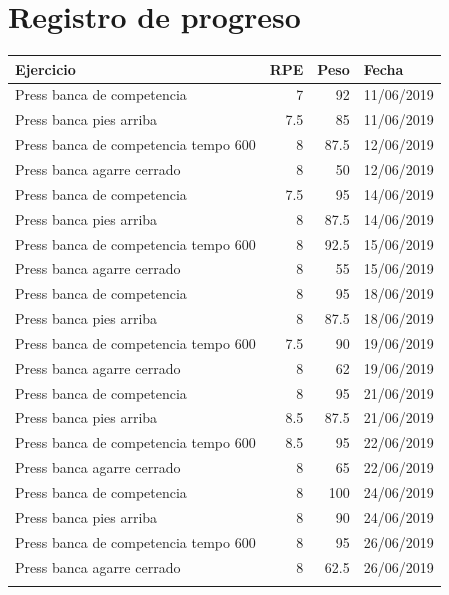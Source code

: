 \documentclass[11pt]{article}
\begin{document}
\section{Registro de progreso}
\label{sec:org83e88e3}
\begin{center}
\label{tab:org8940185}
\begin{tabular}{lrrl}
Ejercicio & RPE & Peso & Fecha\\
\hline
Press banca de competencia & 7 & 92 & 11/06/2019\\
Press banca pies arriba & 7.5 & 85 & 11/06/2019\\
Press banca de competencia tempo 600 & 8 & 87.5 & 12/06/2019\\
Press banca agarre cerrado & 8 & 50 & 12/06/2019\\
Press banca de competencia & 7.5 & 95 & 14/06/2019\\
Press banca pies arriba & 8 & 87.5 & 14/06/2019\\
Press banca de competencia tempo 600 & 8 & 92.5 & 15/06/2019\\
Press banca agarre cerrado & 8 & 55 & 15/06/2019\\
Press banca de competencia & 8 & 95 & 18/06/2019\\
Press banca pies arriba & 8 & 87.5 & 18/06/2019\\
Press banca de competencia tempo 600 & 7.5 & 90 & 19/06/2019\\
Press banca agarre cerrado & 8 & 62 & 19/06/2019\\
Press banca de competencia & 8 & 95 & 21/06/2019\\
Press banca pies arriba & 8.5 & 87.5 & 21/06/2019\\
Press banca de competencia tempo 600 & 8.5 & 95 & 22/06/2019\\
Press banca agarre cerrado & 8 & 65 & 22/06/2019\\
Press banca de competencia & 8 & 100 & 24/06/2019\\
Press banca pies arriba & 8 & 90 & 24/06/2019\\
Press banca de competencia tempo 600 & 8 & 95 & 26/06/2019\\
Press banca agarre cerrado & 8 & 62.5 & 26/06/2019\\
 &  &  & \\
\end{tabular}
\end{center}
\end{document}

